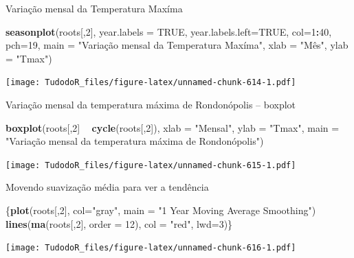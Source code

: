 \documentclass[
]{book}
\newenvironment{Shaded}{\begin{snugshade}}{\end{snugshade}}
\newcommand{\DataTypeTok}[1]{\textcolor[rgb]{0.13,0.29,0.53}{#1}}
\newcommand{\DecValTok}[1]{\textcolor[rgb]{0.00,0.00,0.81}{#1}}
\newcommand{\KeywordTok}[1]{\textcolor[rgb]{0.13,0.29,0.53}{\textbf{#1}}}
\newcommand{\NormalTok}[1]{#1}
\newcommand{\OperatorTok}[1]{\textcolor[rgb]{0.81,0.36,0.00}{\textbf{#1}}}
\newcommand{\OtherTok}[1]{\textcolor[rgb]{0.56,0.35,0.01}{#1}}
\newcommand{\StringTok}[1]{\textcolor[rgb]{0.31,0.60,0.02}{#1}}
\begin{document}
Variação mensal da Temperatura Maxíma

\begin{Shaded}
\begin{Highlighting}[]
\KeywordTok{seasonplot}\NormalTok{(roots[,}\DecValTok{2}\NormalTok{], }\DataTypeTok{year.labels =} \OtherTok{TRUE}\NormalTok{, }\DataTypeTok{year.labels.left=}\OtherTok{TRUE}\NormalTok{, }\DataTypeTok{col=}\DecValTok{1}\OperatorTok{:}\DecValTok{40}\NormalTok{, }\DataTypeTok{pch=}\DecValTok{19}\NormalTok{, }\DataTypeTok{main =} \StringTok{"Variação mensal da Temperatura Maxíma"}\NormalTok{, }\DataTypeTok{xlab =} \StringTok{"Mês", ylab = "}\NormalTok{Tmax}\StringTok{")}
\end{Highlighting}
\end{Shaded}

\texttt{[image: TudodoR\_files/figure-latex/unnamed-chunk-614-1.pdf]}

Variação mensal da temperatura máxima de Rondonópolis -- boxplot

\begin{Shaded}
\begin{Highlighting}[]
\KeywordTok{boxplot}\NormalTok{(roots[,}\DecValTok{2}\NormalTok{] }\OperatorTok{~}\StringTok{ }\KeywordTok{cycle}\NormalTok{(roots[,}\DecValTok{2}\NormalTok{]), }\DataTypeTok{xlab =} \StringTok{"Mensal"}\NormalTok{, }\DataTypeTok{ylab =} \StringTok{"Tmax"}\NormalTok{, }\DataTypeTok{main =} \StringTok{"Variação mensal da temperatura máxima de Rondonópolis")}
\end{Highlighting}
\end{Shaded}

\texttt{[image: TudodoR\_files/figure-latex/unnamed-chunk-615-1.pdf]}

Movendo suavização média para ver a tendência

\begin{Shaded}
\begin{Highlighting}[]
\NormalTok{\{}\KeywordTok{plot}\NormalTok{(roots[,}\DecValTok{2}\NormalTok{], }\DataTypeTok{col=}\StringTok{"gray"}\NormalTok{, }\DataTypeTok{main =} \StringTok{"1 Year Moving Average Smoothing"}\NormalTok{)}
\KeywordTok{lines}\NormalTok{(}\KeywordTok{ma}\NormalTok{(roots[,}\DecValTok{2}\NormalTok{], }\DataTypeTok{order =} \DecValTok{12}\NormalTok{), }\DataTypeTok{col =} \StringTok{"red"}\NormalTok{, }\DataTypeTok{lwd=}\DecValTok{3}\NormalTok{)\}}
\end{Highlighting}
\end{Shaded}

\texttt{[image: TudodoR\_files/figure-latex/unnamed-chunk-616-1.pdf]}
\end{document}

